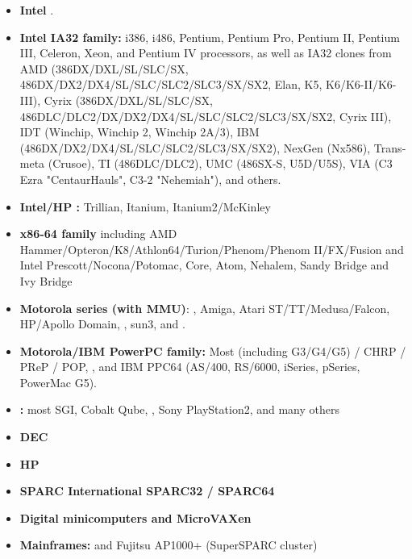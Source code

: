 \begin{latin}
\begin{itemize}
	\item {\bfseries Intel }.
	\item {\bfseries Intel IA32 family:} i386, i486, Pentium, Pentium Pro,
		Pentium II, Pentium III, Celeron, Xeon, and Pentium IV processors,
		as well as IA32 clones from AMD (386DX/DXL/SL/SLC/SX,
		486DX/DX2/DX4/SL/SLC/SLC2/SLC3/SX/SX2, Elan, K5,
		K6/K6-II/K6-III), Cyrix (386DX/DXL/SL/SLC/SX,
		486DLC/DLC2/DX/DX2/DX4/SL/SLC/SLC2/SLC3/SX/SX2, Cyrix III),
		IDT (Winchip, Winchip 2, Winchip 2A/3),
		IBM (486DX/DX2/DX4/SL/SLC/SLC2/SLC3/SX/SX2),
		NexGen (Nx586), Transmeta (Crusoe),
		TI (486DLC/DLC2), UMC (486SX-S, U5D/U5S),
		VIA (C3 Ezra "CentaurHauls", C3-2 "Nehemiah"),
		and others.
	\item {\bfseries Intel/HP :} Trillian, Itanium, Itanium2/McKinley
	\item {\bfseries x86-64 family} including AMD Hammer/Opteron/K8/Athlon64/Turion/Phenom/Phenom II/FX/Fusion and
		Intel Prescott/Nocona/Potomac, Core, Atom, Nehalem, Sandy Bridge and Ivy Bridge
	\item {\bfseries Motorola  series (with MMU)}:
		,
		Amiga, Atari ST/TT/Medusa/Falcon, HP/Apollo Domain,
		, sun3, and
		.
	\item {\bfseries Motorola/IBM PowerPC family:} Most
		 (including G3/G4/G5)  / CHRP / PReP / POP, , and IBM PPC64 (AS/400, RS/6000, iSeries,	pSeries, PowerMac G5).
	\item {\bfseries {}:} most SGI, Cobalt Qube,
		, Sony PlayStation2, and many others
	\item {\bfseries DEC}
	\item {\bfseries HP }
	\item {\bfseries SPARC International SPARC32 / SPARC64}
	\item {\bfseries Digital  minicomputers and MicroVAXen}
	\item {\bfseries Mainframes:} 
		 and Fujitsu AP1000+ (SuperSPARC cluster)
\end{itemize}
\end{latin}

